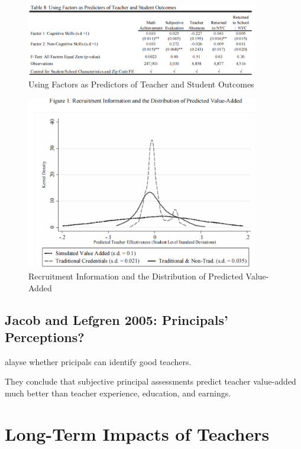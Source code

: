             \begin{figure}[H]
                \centering
                \includegraphics[width=4in]{images/ch9/9 rockoff 4.png}
                \caption{Using Factors as Predictors of Teacher and Student Outcomes}
            \end{figure}
            \begin{figure}[H]
                \centering
                \includegraphics[width=4in]{images/ch9/9 rockoff 5.png}
                \caption{Recruitment Information and the Distribution of Predicted Value-Added}
            \end{figure}

    \subsection{Jacob and Lefgren 2005: Principals' Perceptions?}

        \cite{jacob_principals_2005} alayse whether pricipals can identify good teachers.

        They conclude that subjective principal assessments predict teacher value-added much better than teacher experience, education, and earnings. 

\section{Long-Term Impacts of Teachers}

